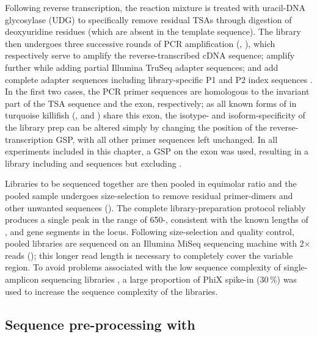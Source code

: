 Following reverse transcription, the reaction mixture is treated with uracil-DNA glycosylase (UDG) to specifically remove residual TSAs through digestion of deoxyuridine residues (which are absent in the template sequence). The library then undergoes three successive rounds of PCR amplification (, ), which respectively serve to amplify the reverse-transcribed cDNA sequence; amplify further while adding partial Illumina TruSeq adapter sequences; and add complete adapter sequences including library-specific P1 and P2 index sequences \parencite{vollmers2013consensus}. In the first two cases, the PCR primer sequences are homologous to the invariant part of the TSA sequence and the  exon, respectively; as all known forms of \igh{} in turquoise killifish (,  and ) share this exon, the isotype- and isoform-specificity of the library prep can be altered simply by changing the position of the reverse-transcription GSP, with all other primer sequences left unchanged. In all experiments included in this chapter, a GSP on the  exon was used, resulting in a library including  and  sequences but excluding .

Libraries to be sequenced together are then pooled in equimolar ratio and the pooled sample undergoes size-selection to remove residual primer-dimers and other unwanted sequences (). The complete library-preparation protocol reliably produces a single peak in the range of 650-, consistent with the known lengths of \vh, \dh and \jh gene segments in the \Nfu locus. Following size-selection and quality control, pooled libraries are sequenced on an Illumina MiSeq sequencing machine with 2$\times$ reads (); this longer read length is necessary to completely cover the variable region. To avoid problems associated with the low sequence complexity of single-amplicon sequencing libraries \parencite{illumina2017diversity}, a large proportion of PhiX spike-in (30\,\%) was used to increase the sequence complexity of the libraries.

\subsection{Sequence pre-processing with }
\label{sec:igseq_protocol_preprocess}

